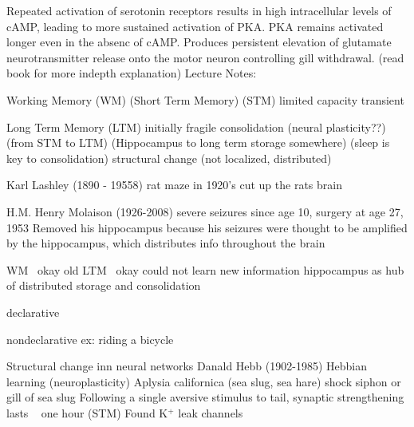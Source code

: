 \documentclass{article}
\begin{document}
Repeated activation of serotonin receptors results in high intracellular levels of cAMP, leading to more sustained activation of PKA. PKA remains activated longer even in the absenc of cAMP. Produces persistent elevation of glutamate neurotransmitter release onto the motor neuron controlling gill withdrawal. (read book for more indepth explanation)
\newpage
Lecture Notes:

Working Memory (WM) (Short Term Memory) (STM)
limited capacity transient

Long Term Memory (LTM)
initially fragile
consolidation (neural plasticity??) (from STM to LTM) (Hippocampus to long term storage somewhere) (sleep is key to consolidation) 
structural change (not localized, distributed)

Karl Lashley (1890 - 19558) 
rat maze in 1920's
cut up the rats brain


H.M. Henry Molaison (1926-2008)
severe seizures since age 10, surgery at age 27, 1953
Removed his hippocampus because his seizures were thought to be amplified by the hippocampus, which distributes info throughout the brain

WM ~okay
old LTM ~okay
could not learn new information
hippocampus as hub of distributed storage and consolidation

declarative  

nondeclarative
ex: riding a bicycle

Structural change inn neural networks 
Danald Hebb (1902-1985) 
Hebbian learning (neuroplasticity) 
Aplysia californica (sea slug, sea hare) 
shock siphon or gill of sea slug
Following a single aversive stimulus to tail, synaptic strengthening lasts ~ one hour (STM) 
Found K$^+$ leak channels 
\end{document}

